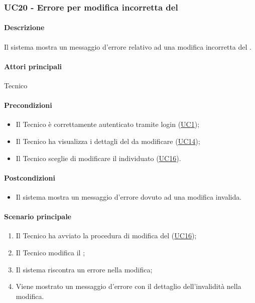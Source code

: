 \subsubsection{UC20 - Errore per modifica incorretta del }\label{UC20}
\paragraph*{Descrizione}
Il sistema mostra un messaggio d’errore relativo ad una modifica incorretta del .

\paragraph*{Attori principali}
Tecnico

\paragraph*{Precondizioni}
\begin{itemize}
  \item Il Tecnico è correttamente autenticato tramite login (\hyperref[UC1]{UC1});
  \item Il Tecnico ha visualizza i dettagli del  da modificare (\hyperref[UC14]{UC14});
  \item Il Tecnico sceglie di modificare il  individuato (\hyperref[UC16]{UC16}).
\end{itemize}

\paragraph*{Postcondizioni}
\begin{itemize}
  \item Il sistema mostra un messaggio d’errore dovuto ad una modifica invalida.
\end{itemize}

\paragraph*{Scenario principale}
\begin{enumerate}
  \item Il Tecnico ha avviato la procedura di modifica del  (\hyperref[UC16]{UC16});
  \item Il Tecnico modifica il ;
  \item Il sistema riscontra un errore nella modifica;
  \item Viene mostrato un messaggio d'errore con il dettaglio dell'invalidità nella modifica.  
\end{enumerate}

